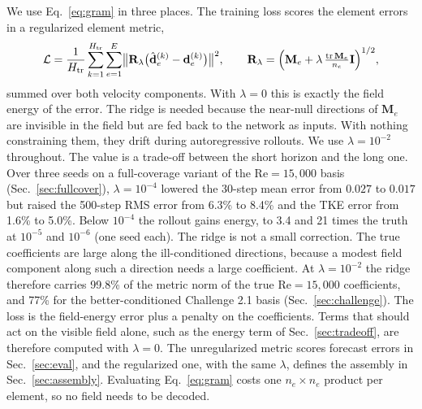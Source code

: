 \documentclass[conf]{new-aiaa}
\newcommand{\Rey}{\mathrm{Re}}
\newcommand{\dvec}{\mathbf{d}}
\newcommand{\dhat}{\hat{\mathbf{d}}}
\begin{document}
We use Eq.~\eqref{eq:gram} in three places. The training loss scores the element errors in a regularized element metric,
\begin{equation}
  \mathcal{L}=\frac{1}{H_\mathrm{tr}}\sum_{k=1}^{H_\mathrm{tr}}\sum_{e=1}^{E}\bigl\|\mathbf{R}_\lambda\bigl(\dhat_e^{(k)}-\dvec_e^{(k)}\bigr)\bigr\|^2,\qquad
  \mathbf{R}_\lambda=\Bigl(\mathbf{M}_e+\lambda\,\tfrac{\operatorname{tr}\mathbf{M}_e}{n_e}\mathbf{I}\Bigr)^{1/2},
  \label{eq:loss}
\end{equation}
summed over both velocity components. With $\lambda=0$ this is exactly the field energy of the error. The ridge is needed because the near-null directions of $\mathbf{M}_e$ are invisible in the field but are fed back to the network as inputs. With nothing constraining them, they drift during autoregressive rollouts. We use $\lambda=10^{-2}$ throughout. The value is a trade-off between the short horizon and the long one. Over three seeds on a full-coverage variant of the $\Rey=15{,}000$ basis (Sec.~\ref{sec:fullcover}), $\lambda=10^{-4}$ lowered the 30-step mean error from $0.027$ to $0.017$ but raised the 500-step RMS error from 6.3\% to 8.4\% and the TKE error from 1.6\% to 5.0\%. Below $10^{-4}$ the rollout gains energy, to 3.4 and 21 times the truth at $10^{-5}$ and $10^{-6}$ (one seed each).
The ridge is not a small correction. The true coefficients are large along the ill-conditioned directions, because a modest field component along such a direction needs a large coefficient. At $\lambda=10^{-2}$ the ridge therefore carries 99.8\% of the metric norm of the true $\Rey=15{,}000$ coefficients, and 77\% for the better-conditioned Challenge 2.1 basis (Sec.~\ref{sec:challenge}). The loss is the field-energy error plus a penalty on the coefficients. Terms that should act on the visible field alone, such as the energy term of Sec.~\ref{sec:tradeoff}, are therefore computed with $\lambda=0$. The unregularized metric scores forecast errors in Sec.~\ref{sec:eval}, and the regularized one, with the same $\lambda$, defines the assembly in Sec.~\ref{sec:assembly}. Evaluating Eq.~\eqref{eq:gram} costs one $n_e\times n_e$ product per element, so no field needs to be decoded.
\end{document}

